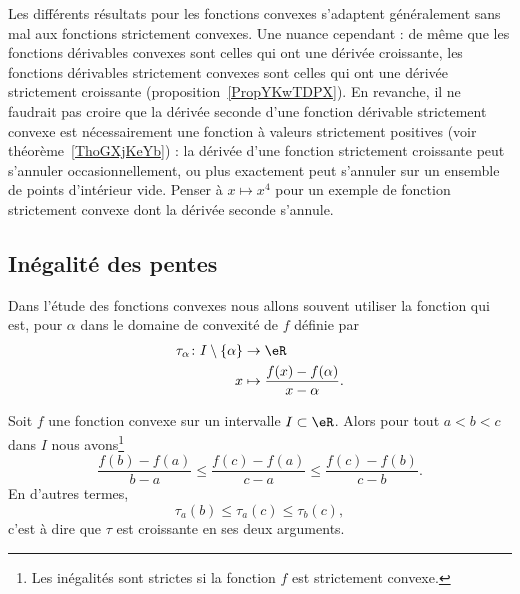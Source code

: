 \begin{normaltext}
    Les différents résultats pour les fonctions convexes s'adaptent généralement sans mal aux fonctions strictement convexes. Une nuance cependant : de même que les fonctions dérivables convexes sont celles qui ont une dérivée croissante, les fonctions dérivables strictement convexes sont celles qui ont une dérivée strictement croissante (proposition~\ref{PropYKwTDPX}). En revanche, il ne faudrait pas croire que la dérivée seconde d'une fonction dérivable strictement convexe est nécessairement une fonction à valeurs strictement positives (voir théorème~\ref{ThoGXjKeYb}) : la dérivée d'une fonction strictement croissante peut s'annuler occasionnellement, ou plus exactement peut s'annuler sur un ensemble de points d'intérieur vide. Penser à \( x\mapsto x^4\) pour un exemple de fonction strictement convexe dont la dérivée seconde s'annule.
\end{normaltext}

\subsection{Inégalité des pentes}

Dans l'étude des fonctions convexes nous allons souvent utiliser la fonction  qui est, pour \( \alpha\) dans le domaine de convexité de \( f\) définie par
\begin{equation}    \label{EqRYBazWd}
    \begin{aligned}
        \tau_{\alpha}\colon I\setminus\{ \alpha \}&\to \eR \\
        x&\mapsto \frac{ f(x)-f(\alpha) }{ x-\alpha }.
    \end{aligned}
\end{equation}

\begin{proposition} \label{PropMDMGjGO}
    Soit \( f\) une fonction convexe sur un intervalle \( I\subset \eR\). Alors pour tout \( a<b<c\) dans \( I\) nous avons\footnote{Les inégalités sont strictes si la fonction \( f\) est strictement convexe.}
    \begin{equation}
        \frac{ f(b)-f(a)  }{ b-a }\leq\frac{ f(c)-f(a) }{ c-a }\leq \frac{ f(c)-f(b) }{ c-b }.
    \end{equation}
    En d'autres termes,
    \begin{equation}
        \tau_a(b)\leq\tau_a(c)\leq \tau_b(c),
    \end{equation}
    c'est à dire que \( \tau\) est croissante en ses deux arguments.
\end{proposition}

